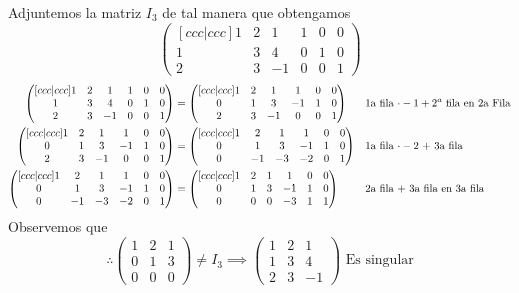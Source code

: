 \documentclass[letterpaper]{article}
\renewcommand{\*}{\cdot}
\theoremstyle{definition}
\begin{document}
	Adjuntemos la matriz $ I_3 $ de tal manera que obtengamos
	\[\begin{pmatrix}[ccc|ccc]
	1 & 2 & 1 & 1 & 0 & 0\\
	1 & 3 & 4 & 0 & 1 & 0\\
	2 & 3 & -1 & 0 & 0 & 1
	\end{pmatrix}\]
	\begin{align*}
		\begin{pmatrix}[ccc|ccc]
		1 & 2 & 1 & 1 & 0 & 0\\
		1 & 3 & 4 & 0 & 1 & 0\\
		2 & 3 & -1 & 0 & 0 & 1
		\end{pmatrix} & = \begin{pmatrix}[ccc|ccc]
		1 & 2 & 1 & 1 & 0 & 0\\
		0 & 1 & 3 & -1 & 1 & 0\\
		2 & 3 & -1 & 0 & 0 & 1
		\end{pmatrix} && \text{1a fila $ \* -1  + 2^a$ fila en 2a Fila}\\
		\begin{pmatrix}[ccc|ccc]
		1 & 2 & 1 & 1 & 0 & 0\\
		0 & 1 & 3 & -1 & 1 & 0\\
		2 & 3 & -1 & 0 & 0 & 1
		\end{pmatrix} &= \begin{pmatrix}[ccc|ccc]
		1 & 2 & 1 & 1 & 0 & 0\\
		0 & 1 & 3 & -1 & 1 & 0\\
		0 & -1 & -3 & -2 & 0 & 1
		\end{pmatrix} && \text{1a fila $ \* -2 $ + 3a fila}\\
		\begin{pmatrix}[ccc|ccc]
		1 & 2 & 1 & 1 & 0 & 0\\
		0 & 1 & 3 & -1 & 1 & 0\\
		0 & -1 & -3 & -2 & 0 & 1
		\end{pmatrix} & = \begin{pmatrix}[ccc|ccc]
		1 & 2 & 1 & 1 & 0 & 0\\
		0 & 1 & 3 & -1 & 1 & 0\\
		0 & 0 & 0 & -3 & 1 & 1
		\end{pmatrix} && \text{2a fila + 3a fila en 3a fila}
	\end{align*}
	Observemos que 
	\[ \therefore \begin{pmatrix}
	1 & 2 & 1 \\
	0 & 1 & 3 \\
	0 & 0 & 0 
	\end{pmatrix} \neq I_3 \implies \begin{pmatrix} 1 & 2 & 1 \\ 1 & 3 & 4 \\ 2 & 3 & -1 \end{pmatrix} \text{ Es singular}  \]
\end{document}
